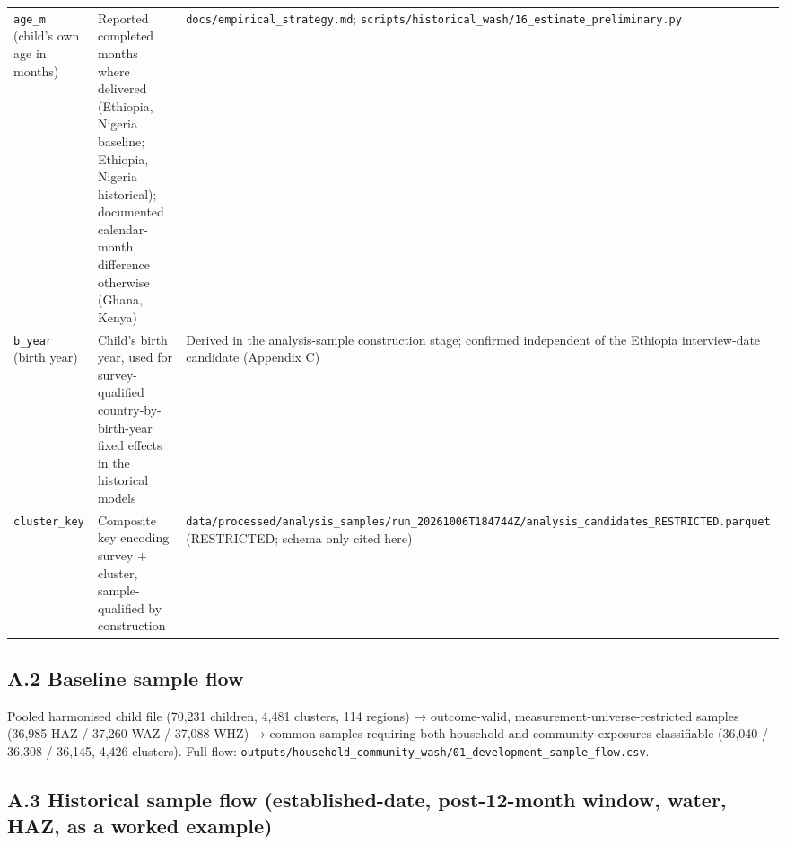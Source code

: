 \begin{longtable}{>{\raggedright\arraybackslash}p{2.65cm}>{\raggedright\arraybackslash}p{6.27cm}>{\raggedright\arraybackslash}p{4.92cm}}
\texttt{age\_\allowbreak{}m} (child's own age in months) & Reported completed months where delivered (Ethiopia, Nigeria baseline; Ethiopia, Nigeria historical); documented calendar-month difference otherwise (Ghana, Kenya) & \texttt{docs/\allowbreak{}empirical\_\allowbreak{}strategy.\allowbreak{}md}; \texttt{scripts/\allowbreak{}historical\_\allowbreak{}wash/\allowbreak{}16\_\allowbreak{}estimate\_\allowbreak{}preliminary.\allowbreak{}py} \\
\texttt{b\_\allowbreak{}year} (birth year) & Child's birth year, used for survey-qualified country-by-birth-year fixed effects in the historical models & Derived in the analysis-sample construction stage; confirmed independent of the Ethiopia interview-date candidate (Appendix C) \\
\texttt{cluster\_\allowbreak{}key} & Composite key encoding survey + cluster, sample-qualified by construction & \texttt{data/\allowbreak{}processed/\allowbreak{}analysis\_\allowbreak{}samples/\allowbreak{}run\_\allowbreak{}20261006T184744Z/\allowbreak{}analysis\_\allowbreak{}candidates\_\allowbreak{}RESTRICTED.\allowbreak{}parquet} (RESTRICTED; schema only cited here) \\
\bottomrule
\end{longtable}
\endgroup

\subsection*{A.2 Baseline sample flow}

Pooled harmonised child file (70,231 children, 4,481 clusters, 114 regions) → outcome-valid, measurement-universe-restricted samples (36,985 HAZ / 37,260 WAZ / 37,088 WHZ) → common samples requiring both household and community exposures classifiable (36,040 / 36,308 / 36,145, 4,426 clusters). Full flow: \texttt{outputs/\allowbreak{}household\_\allowbreak{}community\_\allowbreak{}wash/\allowbreak{}01\_\allowbreak{}development\_\allowbreak{}sample\_\allowbreak{}flow.\allowbreak{}csv}.

\subsection*{A.3 Historical sample flow (established-date, post-12-month window, water, HAZ, as a worked example)}

